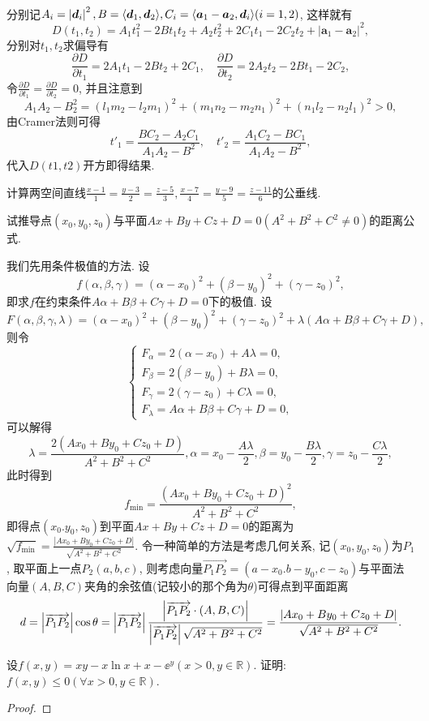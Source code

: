 \begin{quiza}
\begin{solution}
\[\begin{split}
\end{split}\]
分别记\(A_i=\left|\boldsymbol{d}_i\right|^2,B=\langle \boldsymbol{d}_1,\boldsymbol{d}_2 \rangle,C_i=\langle \boldsymbol{a}_1-\boldsymbol{a}_2,\boldsymbol{d}_i \rangle(i=1,2)\), 这样就有\[D(t_1,t_2)=A_1t_1^2-2Bt_1t_2+A_2t_2^2+2C_1t_1-2C_2t_2+\left|\boldsymbol{a}_1-\boldsymbol{a}_2\right|^2,\]
分别对\(t_1,t_2\)求偏导有\[\frac{\partial D}{\partial t_1}=2A_1t_1-2Bt_2+2C_1,\quad
\frac{\partial D}{\partial t_2}=2A_2t_2-2Bt_1-2C_2,\]
令\(\frac{\partial D}{\partial t_1}=\frac{\partial D}{\partial t_2}=0\), 并且注意到\[A_1A_2-B_2^2=(l_1m_2-l_2m_1)^2+(m_1n_2-m_2n_1)^2+(n_1l_2-n_2l_1)^2>0,\]
由Cramer法则可得\[t'_1=\frac{BC_2-A_2C_1}{A_1A_2-B^2},\quad t'_2=\frac{A_1C_2-BC_1}{A_1A_2-B^2},\]
代入\(D(t1,t2)\)开方即得结果.
\end{solution}
\woe 计算两空间直线\(\frac{x-1}{1}=\frac{y-3}{2}=\frac{z-5}{3},\frac{x-7}{4}=\frac{y-9}{5}=\frac{z-11}{6}\)的公垂线.
\begin{solution}

\end{solution}
\woe 试推导点\((x_0,y_0,z_0)\)与平面\(Ax+By+Cz+D=0(A^2+B^2+C^2\ne 0)\)的距离公式.
\begin{solution}
我们先用条件极值的方法. 设\[f(\alpha,\beta,\gamma)=(\alpha-x_0)^2+(\beta-y_0)^2+(\gamma-z_0)^2,\]即求\(f\)在约束条件\(A\alpha+B\beta+C\gamma+D=0\)下的极值. 设\[F(\alpha,\beta,\gamma,\lambda)=(\alpha-x_0)^2+(\beta-y_0)^2+(\gamma-z_0)^2+\lambda\left(A\alpha+B\beta+C\gamma+D\right),\]则令\[\begin{cases}
F_{\alpha}=2\left(\alpha-x_0\right)+A\lambda=0,\\
F_{\beta}=2\left(\beta-y_0\right)+B\lambda=0,\\
F_{\gamma}=2\left(\gamma-z_0\right)+C\lambda=0,\\
F_{\lambda}=A\alpha+B\beta+C\gamma+D=0,
\end{cases}\]
可以解得\[\lambda=\frac{2(Ax_0+By_0+Cz_0+D)}{A^2+B^2+C^2},\alpha=x_0-\frac{A\lambda}{2},\beta=y_0-\frac{B\lambda}{2},\gamma=z_0-\frac{C\lambda}{2},\]此时得到\[f_{\min}=\frac{\left(Ax_0+By_0+Cz_0+D\right)^2}{A^2+B^2+C^2},\]即得点\((x_0.y_0,z_0)\)到平面\(Ax+By+Cz+D=0\)的距离为\(\sqrt{f_{\min}}=\frac{\left|Ax_0+By_0+Cz_0+D\right|}{\sqrt{A^2+B^2+C^2}}\).
\tcbline
令一种简单的方法是考虑几何关系, 记\((x_0,y_0,z_0)\)为\(P_1\), 取平面上一点\(P_2(a,b,c)\), 则考虑向量\(\overrightarrow{P_1P_2}=\left(a-x_0.b-y_0,c-z_0\right)\)与平面法向量\((A,B,C)\)夹角的余弦值(记较小的那个角为\(\theta\))可得点到平面距离\[d=\left|\overrightarrow{P_1P_2}\right|\cos\theta=\left|\overrightarrow{P_1P_2}\right|\frac{\left|\overrightarrow{P_1P_2}\cdot\left(A,B,C\right)\right|}{\left|\overrightarrow{P_1P_2}\right|\sqrt{A^2+B^2+C^2}}=\frac{\left|Ax_0+By_0+Cz_0+D\right|}{\sqrt{A^2+B^2+C^2}}.\qedhere\]
\end{solution}
\woe 设\(f(x,y)=xy-x\ln x+x-\ee^y(x>0,y\in\mathbb{R})\). 证明: \(f(x,y)\leqslant 0(\forall x>0,y\in\mathbb{R})\).
\begin{proof}

\end{proof}
\end{quiza}
